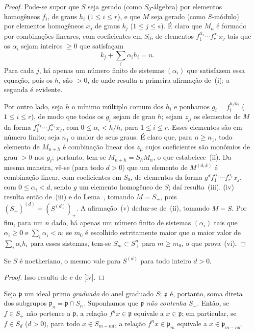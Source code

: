 \documentclass[oneside,10pt]{amsart}
\renewcommand{\leq}{\leqslant}
\renewcommand{\geq}{\geqslant}
\newcommand{\oldpage}[2][]{\marginnote{\normalfont\footnotesize\textbf{#1}~|~#2}\ignorespaces}
\let\EGAOriginalLabel\label
\renewcommand{\label}[1]{\phantomsection\EGAOriginalLabel{#1}}
\begin{document}
\begin{proof}
Pode-se supor que $S$ seja gerado (como $S_0$-álgebra) por elementos homogêneos $f_i$, de graus $h_i$ ($1\leq i\leq r$), e que $M$ seja gerado (como $S$-módulo) por elementos homogêneos $x_j$ de graus $k_j$ ($1\leq j\leq s$).
É claro que $M_n$ é formado por combinações
\oldpage[II]{22}
lineares, com coeficientes em $S_0$, de elementos $f_1^{\alpha_1}\cdots f_r^{\alpha_r}x_j$ tais que os $\alpha_i$ sejam inteiros $\geq0$ que satisfaçam
\[
  k_j+\sum_i\alpha_i h_i=n.
\]
Para cada $j$, há apenas um número finito de sistemas $(\alpha_i)$ que satisfazem essa equação, pois os $h_i$ são $>0$, de onde resulta a primeira afirmação de~(i); a segunda é evidente.

Por outro lado, seja $h$ o mínimo múltiplo comum dos $h_i$ e ponhamos $g_i=f_i^{h/h_i}$ ($1\leq i\leq r$), de modo que todos os $g_i$ sejam de grau $h$; sejam $z_\mu$ os elementos de $M$ da forma $f_1^{\alpha_1}\cdots f_r^{\alpha_r}x_j$, com $0\leq\alpha_i<h/h_i$ para $1\leq i\leq r$.
Esses elementos são em número finito; seja $n_1$ o maior de seus graus.
É claro que, para $n\geq n_1$, todo elemento de $M_{n+h}$ é combinação linear dos $z_\mu$ cujos coeficientes são monômios de grau $>0$ nos $g_i$; portanto, tem-se $M_{n+h}=S_hM_n$, o que estabelece~(ii).
Da mesma maneira, vê-se (para todo $d>0$) que um elemento de $M^{(d,k)}$ é combinação linear, com coeficientes em $S_0$, de elementos da forma $g^d f_1^{\alpha_1}\cdots f_r^{\alpha_r}x_j$, com $0\leq\alpha_i<d$, sendo $g$ um elemento homogêneo de $S$; daí resulta~(iii).
(iv) resulta então de~(iii) e do Lema~, tomando $M=S_+$, pois $(S_+)^{(d)}=(S^{(d)})_+$.
A afirmação~(v) deduz-se de~(ii), tomando $M=S$.
Por fim, para um $n$ dado, há apenas um número finito de sistemas $(\alpha_i)$ tais que $\alpha_i\geq0$ e $\sum_i\alpha_i<n$; se $m_0$ é escolhido estritamente maior que o maior valor de $\sum_i\alpha_i h_i$ para esses sistemas, tem-se $S_m\subset S_+^n$ para $m\geq m_0$, o que prova~(vi).
\end{proof}

\begin{corollary}[2.1.7]
\label{II.2.1.7}
Se $S$ é noetheriano, o mesmo vale para $S^{(d)}$ para todo inteiro $d>0$.
\end{corollary}

\begin{proof}
Isso resulta de  e de [iv].
\end{proof}

\begin{env}[2.1.8]
\label{II.2.1.8}
Seja $\mathfrak{p}$ um ideal primo \emph{graduado} do anel graduado $S$; $\mathfrak{p}$ é, portanto, soma direta dos subgrupos $\mathfrak{p}_n=\mathfrak{p}\cap S_n$.
Suponhamos que \emph{$\mathfrak{p}$ não contenha $S_+$}.
Então, se $f\in S_+$ não pertence a $\mathfrak{p}$, a relação $f^nx\in\mathfrak{p}$ equivale a $x\in\mathfrak{p}$; em particular, se $f\in S_d$ ($d>0$), para todo $x\in S_{m-nd}$, a relação $f^nx\in\mathfrak{p}_m$ equivale a $x\in\mathfrak{p}_{m-nd}$.
\end{env}
\end{document}
